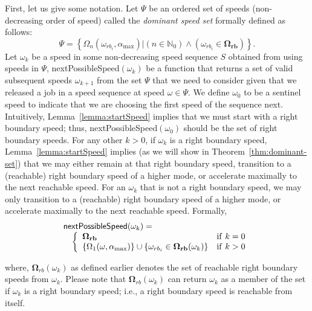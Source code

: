 First, let us give some notation.  Let $\Psi$ be an ordered set of speeds (non-decreasing order of speed) called the \emph{dominant speed set} formally defined as follows:
\begin{equation}\label{eqn:dominant-speeds}
    \Psi =  \left\{\Omega_n (\omega_{rb_i},\alpha_{\max}) | (n\in\mathbb{N}_0) \wedge (\omega_{rb_i} \in \mathbf{\Omega_{rb}}) \right\}.
\end{equation}
Let $\omega_k$ be a speed in some non-decreasing speed sequence $S$ obtained from using speeds in $\Psi$, {\sf nextPossibleSpeed}$(\omega_k)$  be a function that returns a set of valid subsequent speeds $\omega_{k+1}$ from the set $\Psi$ that we need to consider given that we released a job in a speed sequence at speed $\omega \in \Psi$.  We define $\omega_0$ to be a sentinel speed to indicate that we are choosing the first speed of the sequence next.
Intuitively, Lemma~\ref{lemma:startSpeed} implies that we must start with a right boundary speed; thus, {\sf nextPossibleSpeed}$(\omega_0)$ should be the set of right boundary speeds.  For any other $k>0$,  if $\omega_k$ is a right boundary speed, Lemma~\ref{lemma:startSpeed} implies (as we will show in Theorem~\ref{thm:dominant-set}) that we may either remain at that right boundary speed, transition to a (reachable) right boundary speed of a higher mode, or accelerate maximally to the next reachable speed.  For an $\omega_k$ that is not a right boundary speed, we may only transition to a (reachable) right boundary speed of a higher mode, or accelerate maximally to the next reachable speed. Formally,
\begin{equation}\label{eqn:next-speed}
\begin{array}{ll}
  \lefteqn{{\sf nextPossibleSpeed}(\omega_k)=}&\\
     & \left\{
     \begin{array}{ll}
     \mathbf{\Omega_{rb}} & {\rm if}~ k=0 \\ 
     \{\Omega_1(\omega,\alpha_{\max})\} \cup  \{\omega_{rb_i} \in \mathbf{\Omega_{rb}}(\omega_k)\} & {\rm if}~ k >  0 
     \end{array}
     \right.
\end{array}
\end{equation}

\noindent where, $\mathbf{\Omega}_{rb}(\omega_k)$ as defined earlier denotes the set of reachable right boundary speeds from $\omega_k$.  Please note that $\mathbf{\Omega}_{rb}(\omega_k)$ can  return $\omega_k$ as a member of the set if $\omega_k$ is  a right boundary speed; i.e., a right boundary speed is reachable from itself.


